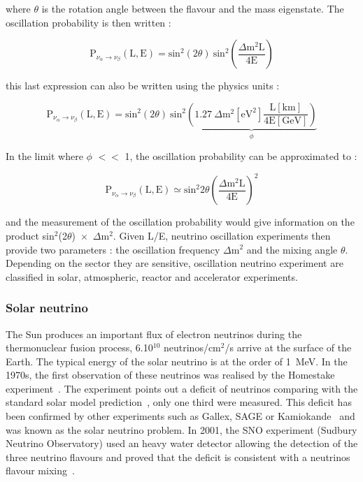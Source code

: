 \documentclass[main.tex]{subfiles}
\begin{document}
\smallskip


\NI where $\theta$ is the rotation angle between the flavour and the mass eigenstate. The oscillation probability is then written :  


\begin{equation}
\text{P}_{\nu_\alpha \rightarrow \nu_\beta} (\text{L},\text{E}) = \text{sin}^\text{2}(\text{2}\theta)~\text{sin}^\text{2} \left( \frac{\Delta \text{m}^\text{2} \text{L}}{\text{4E}} \right)
\end{equation}


\NI this last expression can also be written using the physics units : 


\begin{equation}
\text{P}_{\nu_\alpha \rightarrow \nu_\beta} (\text{L},\text{E}) = \text{sin}^\text{2}(\text{2}\theta)~\text{sin}^\text{2} \underbrace{\left(  \text{1.27}~\Delta \text{m}^\text{2} [\text{eV}^\text{2}] \frac{\text{L}[\text{km}]}{\text{4E}[\text{GeV}]} \right)}_\phi
\end{equation}


\NI In the limit where $\phi$ $<<$ 1, the oscillation probability can be approximated to : 


\begin{equation}
\text{P}_{\nu_\alpha \rightarrow \nu_\beta} (\text{L},\text{E}) \simeq \text{sin}^\text{2} \text{2}\theta  \left( \frac{\Delta\text{m}^\text{2}\text{L}}{\text{4E}} \right)^\text{2} 
\end{equation}


\NI and the measurement of the oscillation probability would give information on the product sin$^\text{2}$(2$\theta$)~$\times$~$\Delta$m$^\text{2}$. Given L/E, neutrino oscillation experiments then provide two parameters : the oscillation frequency $\Delta$m$^\text{2}$ and the mixing angle $\theta$. Depending on the sector they are sensitive, oscillation neutrino experiment are classified in solar, atmospheric, reactor and accelerator experiments. 


\subsubsection{Solar neutrino}


\NI The Sun produces an important flux of electron neutrinos during the thermonuclear fusion process, 6.10$^{\text{10}}$ neutrinos/cm$^{\text{2}}$/s arrive at the surface of the Earth. The typical energy of the solar neutrino is at the order of 1~MeV. In the 1970s, the first observation of these neutrinos was realised by the Homestake experiment~\cite{Homestake}. The experiment points out a deficit of neutrinos comparing with the standard solar model prediction~\cite{NeutrinoFluxSolar}, only one third were measured. This deficit has been confirmed by other experiments such as Gallex, SAGE or Kamiokande~\cite{Gallex,SAGE,Kamiokande2} and was known as the solar neutrino problem. In 2001, the SNO experiment (Sudbury Neutrino Observatory) used an heavy water detector allowing the detection of the three neutrino flavours and proved that the deficit is consistent with a neutrinos flavour mixing~\cite{SNO}.
\end{document}
